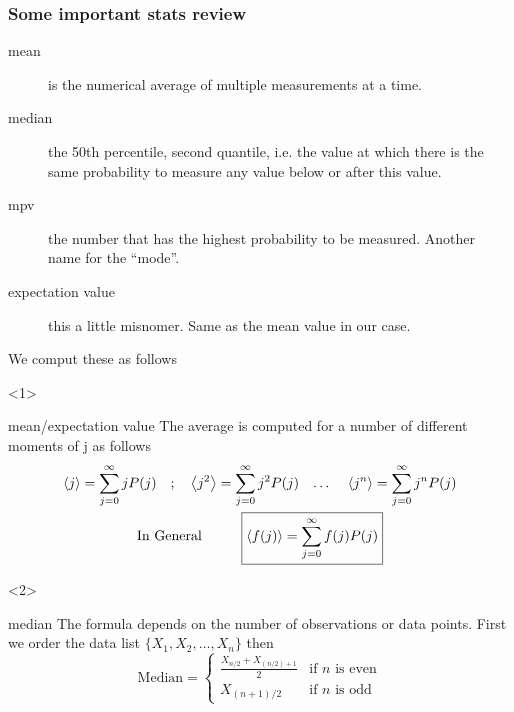\begin{frame}
	\frametitle{Some important stats review}
	\begin{description}
		\item[mean] is the numerical average of multiple measurements at a time.
		\item[median] the 50th percentile, second quantile, i.e. the value at which there
		      is the same probability to measure any value below or after this value.
		\item[mpv] the number that has the highest probability to be measured.
		      Another name for the ``mode''.
		\item[expectation value]  this a little misnomer. Same as the mean value in our case.
	\end{description}
	We comput these as follows

	\begin{onlyenv}

		\begin{block}{mean/expectation value}
			The average is computed for a number of different moments of j as follows
			\begin{gather}
				\ev{j}= \sum_{j=0}^\infty j P(j) \qq{;} \ev{j^2} = \sum_{j=0}^\infty j^2 P(j) \qq{\dots} \ev{j^n} = \sum_{j=0}^\infty j^n P(j)\\
				\text{In General} \hspace{1cm} \boxed{\ev{f(j)} = \sum_{j=0}^\infty f(j) P(j)}
			\end{gather}

		\end{block}

	\end{onlyenv}

	\begin{onlyenv}

		\begin{block}{median}
			The formula depends on the number of observations or data points. First we order the data list
			$\{X_1, X_2, \dots, X_n\}$ then
			\[
				\text{Median} =
				\begin{cases}
					\frac{X_{n/2} + X_{(n/2)+1}}{2} & \text{if } n \text{ is even} \\
					X_{(n+1)/2}                     & \text{if } n \text{ is odd}
				\end{cases}
			\]

		\end{block}

	\end{onlyenv}

\end{frame}


